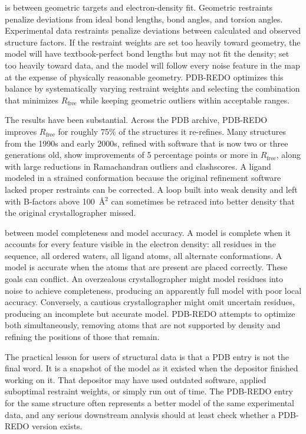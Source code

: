  is between geometric
targets and electron-density fit. Geometric restraints penalize
deviations from ideal bond lengths, bond angles, and torsion angles.
Experimental data restraints penalize deviations between calculated
and observed structure factors. If the restraint weights are set
too heavily toward geometry, the model will have textbook-perfect
bond lengths but may not fit the density; set too heavily toward
data, and the model will follow every noise feature in the map at
the expense of physically reasonable geometry. PDB-REDO optimizes
this balance by systematically varying restraint weights and
selecting the combination that minimizes $R_{\mathrm{free}}$ while
keeping geometric outliers within acceptable ranges.

The results have been substantial. Across the PDB archive,
PDB-REDO improves $R_{\mathrm{free}}$ for roughly 75\% of the
structures it re-refines. Many structures from the 1990s and early
2000s, refined with software that is now two or three generations
old, show improvements of 5 percentage points or more in
$R_{\mathrm{free}}$, along with large reductions in Ramachandran
outliers and clashscores. A ligand modeled in a strained conformation
because the original refinement software lacked proper restraints can
be corrected. A loop built into weak density and left with B-factors
above 100~{\AA}$^2$ can sometimes be retraced into better density
that the original crystallographer missed.

 between
model completeness and model accuracy. A model is complete when it
accounts for every feature visible in the electron density: all
residues in the sequence, all ordered waters, all ligand atoms, all
alternate conformations. A model is accurate when the atoms that are
present are placed correctly. These goals can conflict. An
overzealous crystallographer might model residues into noise to achieve
completeness, producing an apparently full model with poor local
accuracy. Conversely, a cautious crystallographer might omit uncertain
residues, producing an incomplete but accurate model. PDB-REDO
attempts to optimize both simultaneously, removing atoms that are
not supported by density and refining the positions of those that
remain.

The practical lesson for users of structural data is that a PDB
entry is not the final word. It is a snapshot of the model as it
existed when the depositor finished working on it. That depositor
may have used outdated software, applied suboptimal restraint weights,
or simply run out of time. The PDB-REDO entry for the same structure
often represents a better model of the same experimental data, and
any serious downstream analysis should at least check whether a
PDB-REDO version exists.


